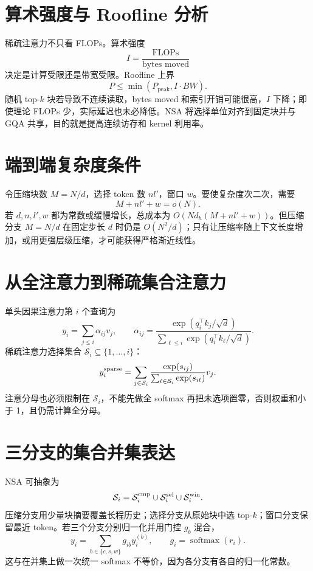 \documentclass[UTF8,12pt,a4paper,fontset=none]{ctexart}
\numberwithin{equation}{section}
\newcommand{\softmax}{\operatorname{softmax}}
\begin{document}
\section{算术强度与 Roofline 分析}
稀疏注意力不只看 FLOPs。算术强度
\begin{equation}
 I=\frac{\text{FLOPs}}{\text{bytes moved}}
\end{equation}
决定是计算受限还是带宽受限。Roofline 上界
\begin{equation}
 P\le\min(P_{\mathrm{peak}},I\cdot BW).
\end{equation}
随机 top-$k$ 块若导致不连续读取，bytes moved 和索引开销可能很高，$I$ 下降；即使理论 FLOPs 少，实际延迟也未必降低。NSA 将选择单位对齐到固定块并与 GQA 共享，目的就是提高连续访存和 kernel 利用率。

\section{端到端复杂度条件}
令压缩块数 $M=N/d$，选择 token 数 $nl'$，窗口 $w$。要使复杂度次二次，需要
\begin{equation}
 M+nl'+w=o(N).
\end{equation}
若 $d,n,l',w$ 都为常数或缓慢增长，总成本为 $O(Nd_h(M+nl'+w))$。但压缩分支 $M=N/d$ 在固定步长 $d$ 时仍是 $O(N^2/d)$；只有让压缩率随上下文长度增加，或用更强层级压缩，才可能获得严格渐近线性。
\clearpage
\section{从全注意力到稀疏集合注意力}
单头因果注意力第 $i$ 个查询为
\begin{equation}
 y_i=\sum_{j\le i}\alpha_{ij}v_j,
 \qquad
 \alpha_{ij}=\frac{\exp(q_i^\top k_j/\sqrt d)}
 {\sum_{\ell\le i}\exp(q_i^\top k_\ell/\sqrt d)}.
\end{equation}
稀疏注意力选择集合 $\mathcal S_i\subseteq\{1,\ldots,i\}$：
\begin{equation}
 y_i^{\rm sparse}=\sum_{j\in\mathcal S_i}
 \frac{\exp(s_{ij})}{\sum_{\ell\in\mathcal S_i}\exp(s_{i\ell})}v_j.
\end{equation}
注意分母也必须限制在 $\mathcal S_i$，不能先做全 softmax 再把未选项置零，否则权重和小于 1，且仍需计算全分母。

\section{三分支的集合并集表达}
NSA 可抽象为
\begin{equation}
 \mathcal S_i=\mathcal S_i^{\rm cmp}
 \cup\mathcal S_i^{\rm sel}
 \cup\mathcal S_i^{\rm win}.
\end{equation}
压缩分支用少量块摘要覆盖长程历史；选择分支从原始块中选 top-$k$；窗口分支保留最近 token。若三个分支分别归一化并用门控 $g_b$ 混合，
\begin{equation}
 y_i=\sum_{b\in\{c,s,w\}}g_{ib}y_i^{(b)},
 \qquad g_i=\softmax(r_i).
\end{equation}
这与在并集上做一次统一 softmax 不等价，因为各分支有各自的归一化常数。
\end{document}
